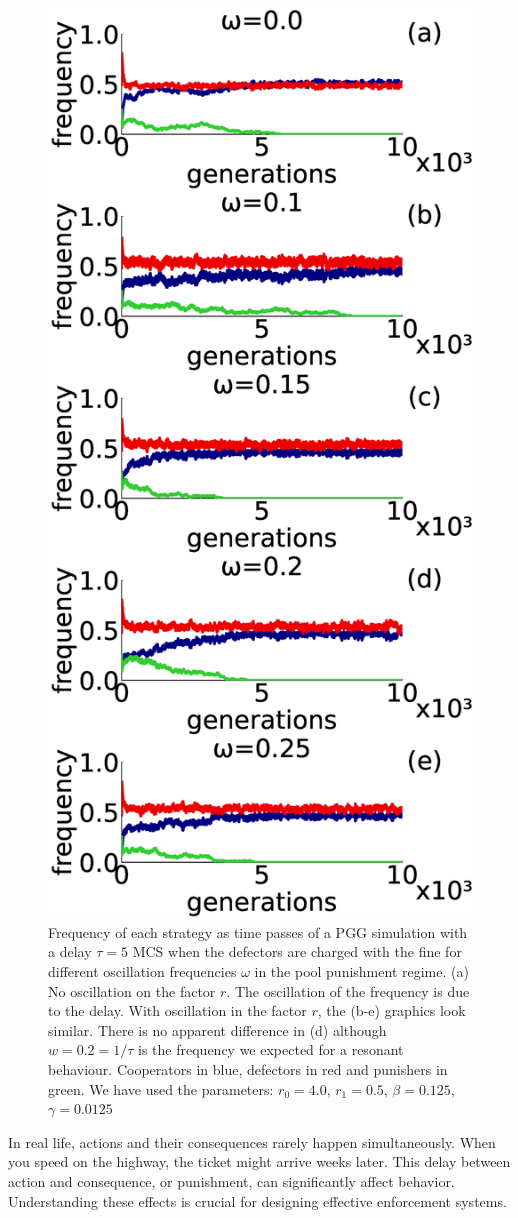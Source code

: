 \begin{figure}
	\centering
	\includegraphics[width=0.6\linewidth]{Images/P2/freq_tiempo_retardoYsin_T0_r04.0_r10.5_tau50000_L100K0.5_t10000.eps}
	\caption{Frequency of each strategy as time passes of a PGG simulation with a delay $\tau=5$ MCS when the defectors are charged with the fine for different oscillation frequencies $\omega$ in the pool punishment regime. (a) No oscillation on the factor $r$. The oscillation of the frequency is due to the delay. With oscillation in the factor $r$, the (b-e) graphics look similar. There is no apparent difference in (d) although $w=0.2=1/\tau$ is the frequency we expected for a resonant behaviour. Cooperators in blue, defectors in red and punishers in green. We have used the parameters: $r_0=4.0$, $r_1=0.5$, $\beta=0.125$, $\gamma=0.0125$}
	\label{tiempo_retardo_oscilacion}
\end{figure}





In real life, actions and their consequences rarely happen simultaneously. When you speed on the highway, the ticket might arrive weeks later. This delay between action and consequence, or punishment, can significantly affect behavior. Understanding these effects is crucial for designing effective enforcement systems.

